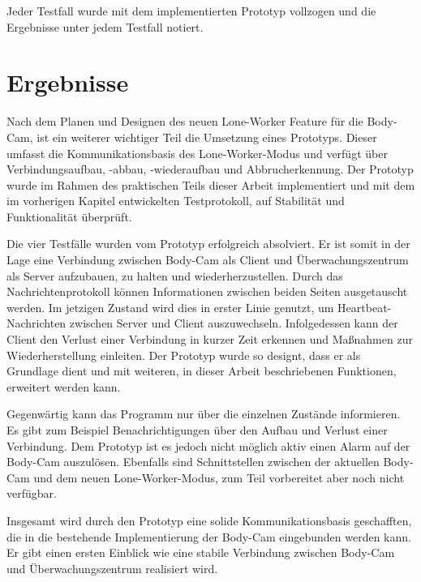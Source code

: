 \documentclass[thesis.tex]{subfiles}
\begin{document}
Jeder Testfall wurde mit dem implementierten Prototyp vollzogen und die Ergebnisse unter jedem Testfall notiert.

\section{Ergebnisse}

Nach dem Planen und Designen des neuen Lone-Worker Feature für die Body-Cam, ist ein weiterer wichtiger Teil die Umsetzung eines Prototyps.
Dieser umfasst die Kommunikationsbasis des Lone-Worker-Modus und verfügt über Verbindungsaufbau, -abbau, -wiederaufbau und Abbrucherkennung.
Der Prototyp wurde im Rahmen des praktischen Teils dieser Arbeit implementiert und mit dem im vorherigen Kapitel entwickelten Testprotokoll, auf Stabilität und Funktionalität überprüft.

Die vier Testfälle wurden vom Prototyp erfolgreich absolviert.
Er ist somit in der Lage eine Verbindung zwischen Body-Cam als Client und Überwachungszentrum als Server aufzubauen, zu halten und wiederherzustellen.
Durch das Nachrichtenprotokoll können Informationen zwischen beiden Seiten ausgetauscht werden.
Im jetzigen Zustand wird dies in erster Linie genutzt, um Heartbeat-Nachrichten zwischen Server und Client auszuwechseln.
Infolgedessen kann der Client den Verlust einer Verbindung in kurzer Zeit erkennen und Maßnahmen zur Wiederherstellung einleiten.
Der Prototyp wurde so designt, dass er als Grundlage dient und mit weiteren, in dieser Arbeit beschriebenen Funktionen, erweitert werden kann.

Gegenwärtig kann das Programm nur über die einzelnen Zustände informieren.
Es gibt zum Beispiel Benachrichtigungen über den Aufbau und Verlust einer Verbindung.
Dem Prototyp ist es jedoch nicht möglich aktiv einen Alarm auf der Body-Cam auszulösen.
Ebenfalls sind Schnittstellen zwischen der aktuellen Body-Cam und dem neuen Lone-Worker-Modus, zum Teil vorbereitet aber noch nicht verfügbar.

Insgesamt wird durch den Prototyp eine solide Kommunikationsbasis geschafften, die in die bestehende Implementierung der Body-Cam eingebunden werden kann.
Er gibt einen ersten Einblick wie eine stabile Verbindung zwischen Body-Cam und Überwachungszentrum realisiert wird.

\subfilebib %
\end{document}
